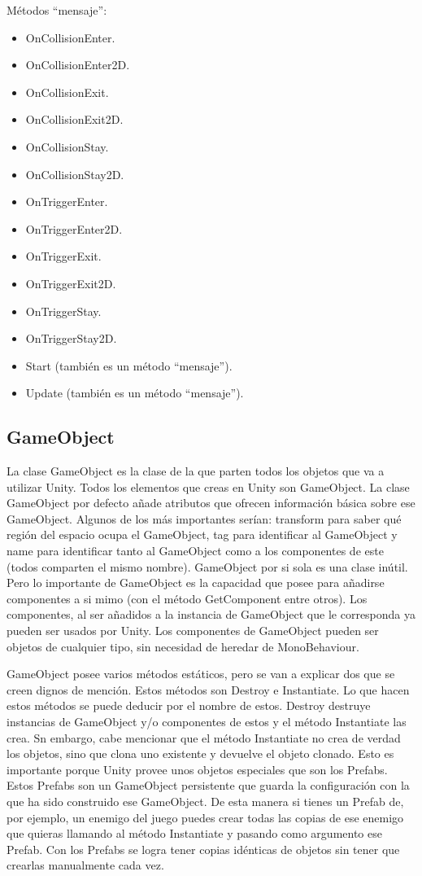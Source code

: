 Métodos “mensaje”:
\begin{itemize}
\item
OnCollisionEnter.
\item
OnCollisionEnter2D.
\item
OnCollisionExit.
\item
OnCollisionExit2D.
\item
OnCollisionStay.
\item
OnCollisionStay2D.
\item
OnTriggerEnter.
\item
OnTriggerEnter2D.
\item
OnTriggerExit.
\item
OnTriggerExit2D.
\item
OnTriggerStay.
\item
OnTriggerStay2D.
\item
Start (también es un método “mensaje”).
\item
Update (también es un método “mensaje”).
\end{itemize}

\subsection{GameObject \cite{ClaseGameObject}}
La clase GameObject es la clase de la que parten todos los objetos que va a utilizar Unity. Todos los elementos que creas en Unity son GameObject. La clase GameObject por defecto añade atributos que ofrecen información básica sobre ese GameObject. Algunos de los más importantes serían: transform para saber qué región del espacio ocupa el GameObject, tag para identificar al GameObject y name para identificar tanto al GameObject como a los componentes de este (todos comparten el mismo nombre).
GameObject por si sola es una clase inútil. Pero lo importante de GameObject es la capacidad que posee para añadirse componentes a si mimo (con el método GetComponent entre otros). Los componentes, al ser añadidos a la instancia de GameObject que le corresponda ya pueden ser usados por Unity. Los componentes de GameObject pueden ser objetos de cualquier tipo, sin necesidad de heredar de MonoBehaviour.

GameObject posee varios métodos estáticos, pero se van a explicar dos que se creen dignos de mención. Estos métodos son Destroy e Instantiate. Lo que hacen estos métodos se puede deducir por el nombre de estos. Destroy destruye instancias de GameObject y/o componentes de estos y el método Instantiate las crea. Sn embargo, cabe mencionar que el método Instantiate no crea de verdad los objetos, sino que clona uno existente y devuelve el objeto clonado. Esto es importante porque Unity provee unos objetos especiales que son los Prefabs. Estos Prefabs son un GameObject persistente que guarda la configuración con la que ha sido construido ese GameObject. De esta manera si tienes un Prefab de, por ejemplo, un enemigo del juego puedes crear todas las copias de ese enemigo que quieras llamando al método Instantiate y pasando como argumento ese Prefab. Con los Prefabs se logra tener copias idénticas de objetos sin tener que crearlas manualmente cada vez.

